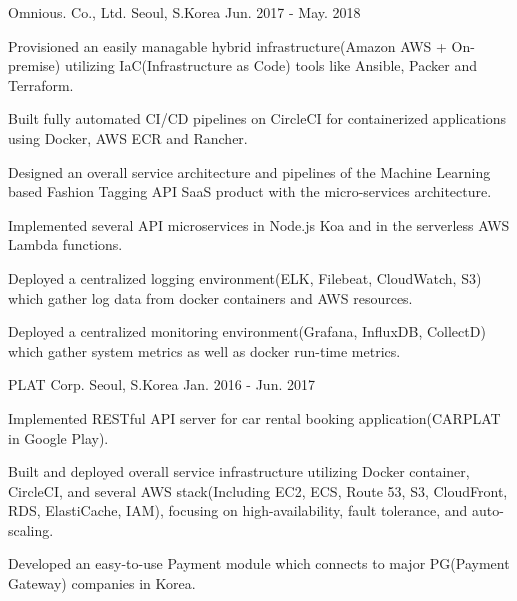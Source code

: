 \begin{cventries}
	{Omnious. Co., Ltd.} %
	{Seoul, S.Korea} %
	{Jun. 2017 - May. 2018} %
	{
		\begin{cvitems} %
			\item {Provisioned an easily managable hybrid infrastructure(Amazon AWS + On-premise) utilizing IaC(Infrastructure as Code) tools like Ansible, Packer and Terraform.}
			\item {Built fully automated CI/CD pipelines on CircleCI for containerized applications using Docker, AWS ECR and Rancher.}
			\item {Designed an overall service architecture and pipelines of the Machine Learning based Fashion Tagging API SaaS product with the micro-services architecture.}
			\item {Implemented several API microservices in Node.js Koa and in the serverless AWS Lambda functions.}
			\item {Deployed a centralized logging environment(ELK, Filebeat, CloudWatch, S3) which gather log data from docker containers and AWS resources.}
			\item {Deployed a centralized monitoring environment(Grafana, InfluxDB, CollectD) which gather system metrics as well as docker run-time metrics.}
		\end{cvitems}
	}

	{PLAT Corp.} %
	{Seoul, S.Korea} %
	{Jan. 2016 - Jun. 2017} %
	{
		\begin{cvitems} %
			\item {Implemented RESTful API server for car rental booking application(CARPLAT in Google Play).}
			\item {Built and deployed overall service infrastructure utilizing Docker container, CircleCI, and several AWS stack(Including EC2, ECS, Route 53, S3, CloudFront, RDS, ElastiCache, IAM), focusing on high-availability, fault tolerance, and auto-scaling.}
			\item {Developed an easy-to-use Payment module which connects to major PG(Payment Gateway) companies in Korea.}
		\end{cvitems}
	}


\end{cventries}
